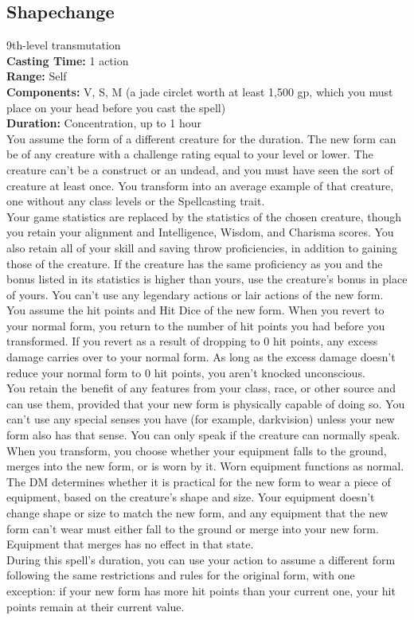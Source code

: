 \documentclass[11pt, A4paper, english]{article}
\begin{document}
		\subsection{Shapechange}
9th-level transmutation \\
\textbf{Casting Time:} 1 action \\
\textbf{Range:} Self \\
\textbf{Components:} V, S, M (a jade circlet worth at least 1,500 gp, which you must place on your head before you cast the spell) \\
\textbf{Duration:} Concentration, up to 1 hour \\
You assume the form of a different creature for the duration. The new form can be of any creature with a challenge rating equal to your level or lower. The creature can’t be a construct or an undead, and you must have seen the sort of creature at least once. You transform into an average example of that creature, one without any class levels or the Spellcasting trait. \\
Your game statistics are replaced by the statistics of the chosen creature, though you retain your alignment and Intelligence, Wisdom, and Charisma scores. You also retain all of your skill and saving throw proficiencies, in addition to gaining those of the creature. If the creature has the same proficiency as you and the bonus listed in its statistics is higher than yours, use the creature’s bonus in place of yours. You can’t use any legendary actions or lair actions of the new form. \\
You assume the hit points and Hit Dice of the new form. When you revert to your normal form, you return to the number of hit points you had before you transformed. If you revert as a result of dropping to 0 hit points, any excess damage carries over to your normal form. As long as the excess damage doesn’t reduce your normal form to 0 hit points, you aren’t knocked unconscious. \\
You retain the benefit of any features from your class, race, or other source and can use them, provided that your new form is physically capable of doing so. You can’t use any special senses you have (for example, darkvision) unless your new form also has that sense. You can only speak if the creature can normally speak. \\
When you transform, you choose whether your equipment falls to the ground, merges into the new form, or is worn by it. Worn equipment functions as normal. The DM determines whether it is practical for the new form to wear a piece of equipment, based on the creature’s shape and size. Your equipment doesn’t change shape or size to match the new form, and any equipment that the new form can’t wear must either fall to the ground or merge into your new form. Equipment that merges has no effect in that state. \\
During this spell’s duration, you can use your action to assume a different form following the same restrictions and rules for the original form, with one exception: if your new form has more hit points than your current one, your hit points remain at their current value.
\end{document}
